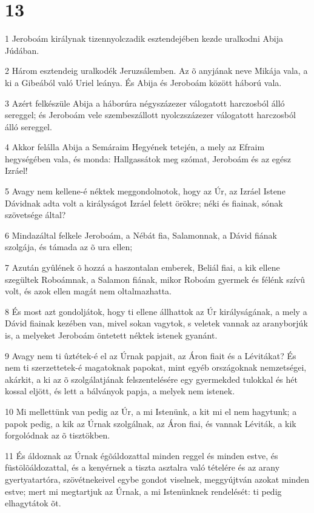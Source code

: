 \chapter{13}

\par 1 Jeroboám királynak tizennyolczadik esztendejében kezde uralkodni Abija Júdában.
\par 2 Három esztendeig uralkodék Jeruzsálemben. Az õ anyjának neve Mikája vala, a ki a Gibeából való Uriel leánya. És Abija és Jeroboám között háború vala.
\par 3 Azért felkészüle Abija a háborúra négyszázezer válogatott harczosból álló sereggel; és Jeroboám vele szembeszállott nyolczszázezer válogatott harczosból álló sereggel.
\par 4 Akkor felálla Abija a Semáraim Hegyének tetején, a mely az Efraim hegységében vala, és monda: Hallgassátok meg szómat, Jeroboám és az egész Izráel!
\par 5 Avagy nem kellene-é néktek meggondolnotok, hogy az Úr, az Izráel Istene Dávidnak adta volt a királyságot Izráel felett örökre; néki és fiainak, sónak szövetsége  által?
\par 6 Mindazáltal felkele Jeroboám, a Nébát fia, Salamonnak, a Dávid fiának szolgája, és támada az õ ura ellen;
\par 7 Azután gyûlének õ hozzá a haszontalan emberek, Beliál fiai, a kik ellene szegültek Roboámnak, a Salamon fiának, mikor Roboám gyermek és félénk szívû volt, és azok ellen magát nem oltalmazhatta.
\par 8 És most azt gondoljátok, hogy ti ellene állhattok az Úr királyságának, a mely a Dávid fiainak kezében van, mivel sokan vagytok, s veletek vannak az aranyborjúk is, a melyeket Jeroboám öntetett  néktek istenek gyanánt.
\par 9 Avagy nem ti ûztétek-é el az Úrnak papjait, az Áron fiait és a Lévitákat? És nem ti szerzettetek-é magatoknak papokat, mint egyéb országoknak nemzetségei, akárkit, a ki az õ szolgálatjának felszentelésére egy gyermekded tulokkal és hét kossal eljött, és lett a bálványok papja, a melyek nem istenek.
\par 10 Mi mellettünk van pedig az Úr, a mi Istenünk, a kit mi el nem hagytunk; a papok pedig, a kik az Úrnak szolgálnak, az Áron fiai, és vannak Léviták, a kik forgolódnak az õ tisztökben.
\par 11 És áldoznak az Úrnak égõáldozattal minden reggel és minden estve, és füstölõáldozattal, és a kenyérnek a tiszta asztalra való tételére és az arany gyertyatartóra, szövétnekeivel egybe gondot viselnek, meggyújtván azokat minden estve; mert mi megtartjuk az Úrnak, a mi Istenünknek rendelését: ti pedig elhagytátok õt.
